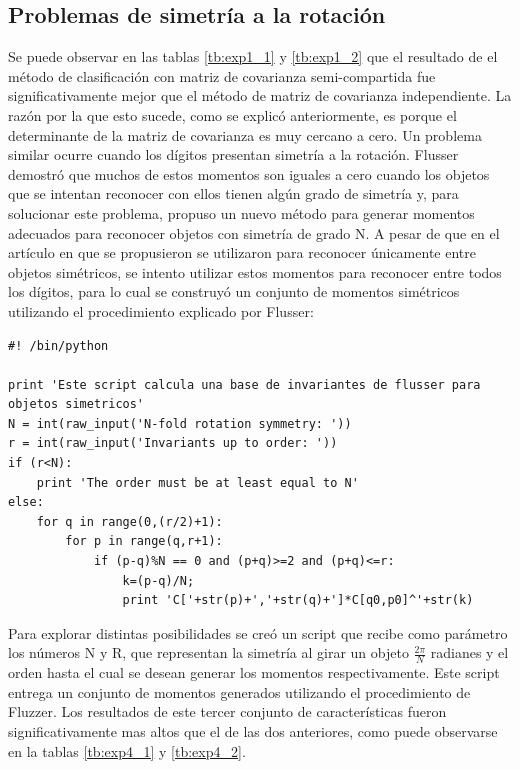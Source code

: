 \documentclass[a4paper, 11pt, oneside]{report}
\newenvironment{mylisting}
{\begin{list}{}{\setlength{\leftmargin}{1em}}\item\scriptsize\bfseries}
{\end{list}}
\begin{document}
\subsection{Problemas de simetría a la rotación}

Se puede observar en las tablas \ref{tb:exp1_1} y \ref{tb:exp1_2} que el resultado de el método de clasificación con matriz de covarianza semi-compartida fue significativamente mejor que el método de matriz de covarianza independiente. La razón por la que esto sucede, como se explicó anteriormente, es porque el determinante de la matriz de covarianza es muy cercano a cero. Un problema similar ocurre cuando los dígitos presentan simetría a la rotación. Flusser\cite{flusser06} demostró que muchos de estos momentos son iguales a cero cuando los objetos que se intentan reconocer con ellos tienen algún grado de simetría y, para solucionar este problema, propuso un nuevo método para generar momentos adecuados para reconocer objetos con simetría de grado N. A pesar de que en el artículo en que se propusieron se utilizaron para reconocer únicamente entre objetos simétricos, se intento utilizar estos momentos para reconocer entre todos los dígitos, para lo cual se construyó un conjunto de momentos simétricos utilizando el procedimiento explicado por Flusser:

\begin{mylisting}
\begin{verbatim}
#! /bin/python

print 'Este script calcula una base de invariantes de flusser para objetos simetricos'
N = int(raw_input('N-fold rotation symmetry: '))
r = int(raw_input('Invariants up to order: '))
if (r<N):
    print 'The order must be at least equal to N'
else:
    for q in range(0,(r/2)+1):
        for p in range(q,r+1):
            if (p-q)%N == 0 and (p+q)>=2 and (p+q)<=r:
                k=(p-q)/N;
                print 'C['+str(p)+','+str(q)+']*C[q0,p0]^'+str(k) 
\end{verbatim}
\end{mylisting}

Para explorar distintas posibilidades se creó un script que recibe como parámetro los números N y R, que representan la simetría al girar un objeto $\frac{2\pi}{N}$ radianes y el orden hasta el cual se desean generar los momentos respectivamente. Este script entrega un conjunto de momentos generados utilizando el procedimiento de Fluzzer. Los resultados de este tercer conjunto de características fueron significativamente mas altos que el de las dos anteriores, como puede observarse en la tablas \ref{tb:exp4_1} y \ref{tb:exp4_2}.
\end{document}
